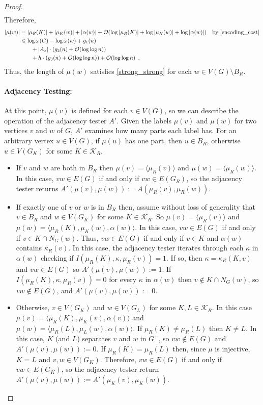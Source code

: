 \documentclass{patmorin}
\let\eqref\cref
\renewcommand{\le}{\leqslant}
\newcommand{\Oh}{\mathcal{O}}
\begin{document}
\begin{proof}
\begin{align*}
    \end{align*}
    Therefore,
    \begin{align*}
      |\mu(w)|
        & =|\mu_R(K)|+|\mu_K(w)|+|\alpha(w)|+ \Oh(\log|\mu_R(K)|+\log|\mu_K(w)|+\log|\alpha(w)|)
        & \text{by \eqref{encoding_cost}} \\
        & \le \log \omega(G) - \log\omega(w) + g_1(n)\\
        & \qquad {} + |A_z|\cdot (g_2(n)+\Oh(\log\log n))\\
        & \qquad {} + h\cdot (g_3(n) + \Oh(\log\log n)) + \Oh(\log\log n)\enspace.
    \end{align*}
    Thus, the length of $\mu(w)$ satisfies \eqref{strong_strong} for each $w\in V(G)\setminus B_R$.

    \paragraph{Adjacency Testing:}  At this point, $\mu(v)$ is defined for each $v\in V(G)$, so we can describe the operation of the adjacency tester $A'$.
    Given the labels $\mu(v)$ and $\mu(w)$ for two vertices $v$ and $w$ of $G$, $A'$ examines how many parts each label has.
    For an arbitrary vertex $u\in V(G)$, if $\mu(u)$ has one part, then $u\in B_R$,
    otherwise $u\in V(G_K)$ for some $K\in\mathcal{K}_R$.
    \begin{itemize}
      \item If $v$ and $w$ are both in $B_R$ then $\mu(v)=\langle\mu_R(v)\rangle$ and $\mu(w)=\langle\mu_R(w)\rangle$.  In this case, $vw\in E(G)$ if and only if $vw\in E(G_R)$, so the adjacency tester returns $A'(\mu(v),\mu(w)):=A(\mu_R(v),\mu_R(w))$.
      \item If exactly one of $v$ or $w$ is in $B_R$ then, assume without loss of generality that $v\in B_R$ and $w\in V(G_K)$ for some $K\in\mathcal{K}_R$.
      So $\mu(v)=\langle\mu_R(v)\rangle$ and $\mu(w)=\langle\mu_R(K),\mu_K(w),\alpha(w)\rangle$.
      In this case, $vw\in E(G)$ if and only if $v\in K\cap N_G(w)$.  Thus, $vw\in E(G)$ if and only if $v\in K$ and $\alpha(w)$ contains $\kappa_R(v)$.  In this case, the adjacency tester iterates through each $\kappa$ in $\alpha(w)$ checking if $I(\mu_R(K),\kappa,\mu_R(v))=1$.  If so, then $\kappa=\kappa_R(K,v)$ and $vw\in E(G)$ so $A'(\mu(v),\mu(w)):=1$. If $I(\mu_R(K),\kappa,\mu_R(v))=0$ for every $\kappa$ in $\alpha(w)$ then $v\not\in K\cap N_G(w)$, so  $vw\not\in E(G)$, and $A'(\mu(v),\mu(w)):=0$.
      \item Otherwise, $v\in V(G_K)$ and $w\in V(G_{L})$ for some $K,L\in\mathcal{K}_R$.
      In this case $\mu(v)=\langle\mu_R(K),\mu_K(v),\alpha(v)\rangle$ and $\mu(w)=\langle\mu_R(L),\mu_{L}(w),\alpha(w)\rangle$.
      If $\mu_R(K)\neq\mu_R(L)$ then $K\neq L$. In this case, $K$ (and $L$) separates $v$ and $w$ in $G^+$, so $vw\not\in E(G)$ and $A'(\mu(v),\mu(w)):=0$.
      If $\mu_R(K)=\mu_R(L)$ then, since $\mu$ is injective, $K=L$ and $v,w\in V(G_K)$.  Therefore, $vw\in E(G)$ if and only if $vw\in E(G_K)$, so the adjacency tester return $A'(\mu(v),\mu(w)):=A'(\mu_{K}(v),\mu_K(w))$.
    \end{itemize}


\end{proof}
\end{document}
